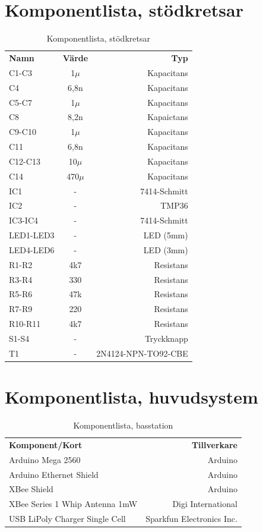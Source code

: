 \documentclass[a4paper,11pt]{article}
\begin{document}
\section{Komponentlista, stödkretsar}

\begin{table}[h]
\centering
	\begin{tabular}{|l|c|r|}
	{\bf Namn} & {\bf Värde} & {\bf Typ} \\
	C1-C3			& 1$\mu$	& Kapacitans \\
	C4			& 6,8n		& Kapacitans \\		
	C5-C7			& 1$\mu$	& Kapacitans \\
	C8			& 8,2n		& Kapaictans \\
	C9-C10			& 1$\mu$	& Kapacitans \\
	C11			& 6,8n		& Kapacitans \\
	C12-C13			& 10$\mu$	& Kapacitans \\
	C14			& 470$\mu$	& Kapacitans \\
	IC1			& -		& 7414-Schmitt \\
	IC2			& -		& TMP36 \\
	IC3-IC4			& -		& 7414-Schmitt \\
	LED1-LED3		& -		& LED (5mm) \\
	LED4-LED6		& -		& LED (3mm) \\
	R1-R2			& 4k7		& Resistans \\
	R3-R4			& 330		& Resistans \\
	R5-R6			& 47k		& Resistans \\
	R7-R9			& 220		& Resistans \\
	R10-R11			& 4k7		& Resistans \\
	S1-S4			& -		& Tryckknapp \\
	T1                      & -		& 2N4124-NPN-TO92-CBE \\
	\end{tabular}
\caption{Komponentlista, stödkretsar}
\label{tab:komponenttable}
\end{table}
\pagebreak

\section{Komponentlista, huvudsystem}
\label{sec:komp_list}

\begin{table}[h]
\centering
	\begin{tabular}{|l|r|}
	{\bf Komponent/Kort} & {\bf Tillverkare} \\
	Arduino Mega 2560                  & Arduino \\
	Arduino Ethernet Shield            & Arduino \\
	XBee Shield                        & Arduino \\
	XBee Series 1 Whip Antenna 1mW     & Digi International \\
	USB LiPoly Charger Single Cell     & Sparkfun Electronics Inc. \\
	\end{tabular}
\caption{Komponentlista, basstation}
\label{tab:korttable_bas}
\end{table}
\end{document}
